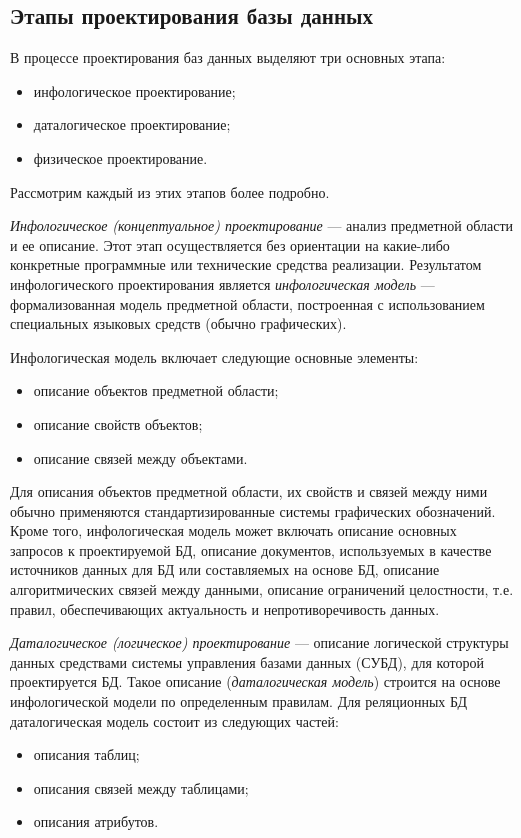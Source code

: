 \subsection{Этапы проектирования базы данных}
\label{ssub:db_structure_stages}

В процессе проектирования баз данных выделяют три основных этапа:
\begin{itemize}
\item инфологическое проектирование;
\item даталогическое проектирование;
\item физическое проектирование.
\end{itemize}

Рассмотрим каждый из этих этапов более подробно.

\textit{Инфологическое (концептуальное) проектирование} --- анализ
предметной области и ее описание. Этот этап осуществляется без ориентации
на какие-либо конкретные программные или технические средства реализации.
Результатом инфологического проектирования является \textit{инфологическая модель} ---
формализованная модель предметной области, построенная с использованием
специальных языковых средств (обычно графических).

Инфологическая модель включает следующие основные элементы:
\begin{itemize}
\item
  описание объектов предметной области;
\item
  описание свойств объектов;
\item
  описание связей между объектами.
\end{itemize}

Для описания объектов предметной области, их свойств и связей между
ними обычно применяются стандартизированные системы графических обозначений.
Кроме того, инфологическая модель может включать
описание основных запросов к проектируемой БД,
описание документов, используемых в качестве
источников данных для БД или составляемых на основе БД,
описание алгоритмических связей между данными,
описание ограничений целостности, т.е. правил, обеспечивающих
актуальность и непротиворечивость данных.

\textit{Даталогическое (логическое) проектирование} --- описание
логической структуры данных средствами системы управления базами данных
(СУБД), для которой проектируется БД.
Такое описание (\textit{даталогическая модель}) строится на основе инфологической модели
по определенным правилам.
Для реляционных БД даталогическая модель состоит из следующих частей:
\begin{itemize}
\item
  описания таблиц;
\item
  описания связей между таблицами;
\item
  описания атрибутов.
\end{itemize}

